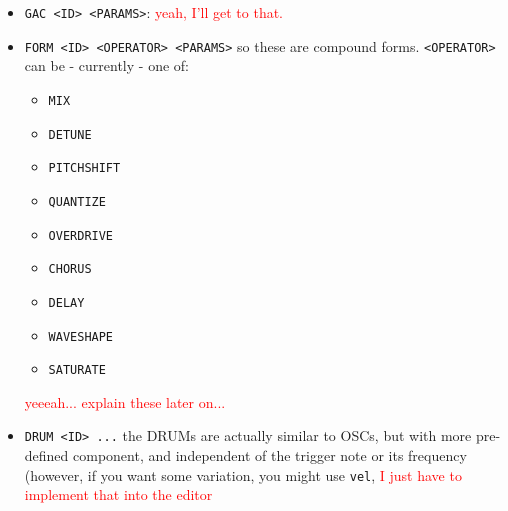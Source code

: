 \documentclass[11pt]{article}
\begin{document}
\begin{itemize}
    \item \texttt{GAC <ID> <PARAMS>}:
      \textcolor{red}{yeah, I'll get to that.}
      
    \item \texttt{FORM <ID> <OPERATOR> <PARAMS>}
      so these are compound forms. \texttt{<OPERATOR>} can be - currently - one of:
      \begin{itemize}
        \item \texttt{MIX}
        \item \texttt{DETUNE}
        \item \texttt{PITCHSHIFT}
        \item \texttt{QUANTIZE}
        \item \texttt{OVERDRIVE}
        \item \texttt{CHORUS}
        \item \texttt{DELAY}
        \item \texttt{WAVESHAPE}
        \item \texttt{SATURATE}
      \end{itemize}
      \textcolor{red}{yeeeah... explain these later on...}
      
      \item \texttt{DRUM <ID> ...}
      the DRUMs are actually similar to OSCs, but with more pre-defined component, and independent of the trigger note or its frequency (however, if you want some variation, you might use \texttt{vel}, \textcolor{red}{I just have to implement that into the editor}
  \end{itemize}
  
\end{document}
